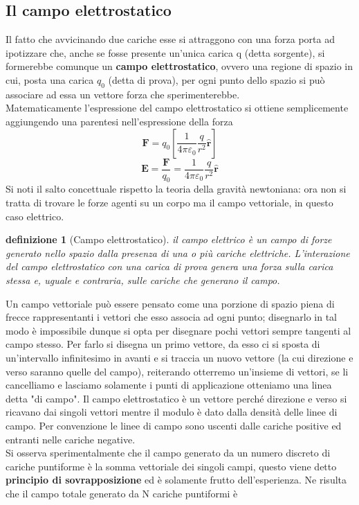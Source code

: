 \documentclass[10pt,a4paper]{article}
\newtheorem{definizione}{definizione}
\begin{document}
\subsection{Il campo elettrostatico}
Il fatto che avvicinando due cariche esse si attraggono con una forza porta ad ipotizzare che, anche se fosse presente un'unica carica q (detta sorgente), si formerebbe comunque un \textbf{campo elettrostatico}, ovvero una regione di spazio in cui, posta una carica \(q_0\) (detta di prova), per ogni punto dello spazio si può associare ad essa un vettore forza che sperimenterebbe.\\
Matematicamente l'espressione del campo elettrostatico si ottiene semplicemente aggiungendo una parentesi nell'espressione della forza 
\[\mathbf{F}=q_0\left[\frac{1}{4\pi\varepsilon_0}\frac{q}{r^2}\hat{\mathbf{r}}\right]\]
\[\mathbf{E} = \frac{\mathbf{F}}{q_0} = \frac{1}{4\pi\varepsilon_0}\frac{q}{r^2}\hat{\mathbf{r}}\]
Si noti il salto concettuale rispetto la teoria della gravità newtoniana: ora non si tratta di trovare le forze agenti su un corpo ma il campo vettoriale, in questo caso elettrico.
\begin{definizione}[Campo elettrostatico]
	 il campo elettrico è un campo di forze generato nello spazio dalla presenza di una o più cariche elettriche. L'interazione del campo elettrostatico con una carica di prova genera una forza sulla carica stessa e, uguale e contraria, sulle cariche che generano il campo.
\end{definizione}
Un campo vettoriale può essere pensato come una porzione di spazio piena di frecce rappresentanti i vettori che esso associa ad ogni punto; disegnarlo in tal modo è impossibile dunque si opta per disegnare pochi vettori sempre tangenti al campo stesso. Per farlo si disegna un primo vettore, da esso ci si sposta di un'intervallo infinitesimo in avanti e si traccia un nuovo vettore (la cui direzione e verso saranno quelle del campo), reiterando otterremo un'insieme di vettori, se li cancelliamo e lasciamo solamente i punti di applicazione otteniamo una linea detta "di campo". Il campo elettrostatico è un vettore perché direzione e verso si ricavano dai singoli vettori mentre il modulo è dato dalla densità delle linee di campo. Per convenzione le linee di campo sono uscenti dalle cariche positive ed entranti nelle cariche negative.\\
Si osserva sperimentalmente che il campo generato da un numero discreto di cariche puntiforme è la somma vettoriale dei singoli campi, questo viene detto \textbf{principio di sovrapposizione} ed è solamente frutto dell'esperienza. Ne risulta che il campo totale generato da N cariche puntiformi è
\end{document}
